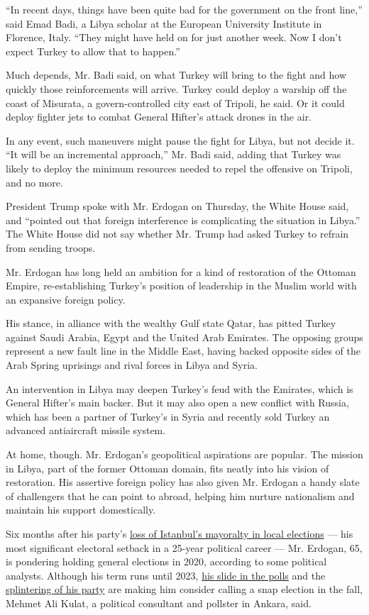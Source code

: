 ``In recent days, things have been quite bad for the government on the
front line,'' said Emad Badi, a Libya scholar at the European University
Institute in Florence, Italy. ``They might have held on for just another
week. Now I don't expect Turkey to allow that to happen.''

Much depends, Mr. Badi said, on what Turkey will bring to the fight and
how quickly those reinforcements will arrive. Turkey could deploy a
warship off the coast of Misurata, a govern-controlled city east of
Tripoli, he said. Or it could deploy fighter jets to combat General
Hifter's attack drones in the air.

In any event, such maneuvers might pause the fight for Libya, but not
decide it. ``It will be an incremental approach,'' Mr. Badi said, adding
that Turkey was likely to deploy the minimum resources needed to repel
the offensive on Tripoli, and no more.

President Trump spoke with Mr. Erdogan on Thursday, the White House
said, and ``pointed out that foreign interference is complicating the
situation in Libya.'' The White House did not say whether Mr. Trump had
asked Turkey to refrain from sending troops.

Mr. Erdogan has long held an ambition for a kind of restoration of the
Ottoman Empire, re-establishing Turkey's position of leadership in the
Muslim world with an expansive foreign policy.

His stance, in alliance with the wealthy Gulf state Qatar, has pitted
Turkey against Saudi Arabia, Egypt and the United Arab Emirates. The
opposing groups represent a new fault line in the Middle East, having
backed opposite sides of the Arab Spring uprisings and rival forces in
Libya and Syria.

An intervention in Libya may deepen Turkey's feud with the Emirates,
which is General Hifter's main backer. But it may also open a new
conflict with Russia, which has been a partner of Turkey's in Syria and
recently sold Turkey an advanced antiaircraft missile system.

At home, though. Mr. Erdogan's geopolitical aspirations are popular. The
mission in Libya, part of the former Ottoman domain, fits neatly into
his vision of restoration. His assertive foreign policy has also given
Mr. Erdogan a handy slate of challengers that he can point to abroad,
helping him nurture nationalism and maintain his support domestically.

Six months after his party's
\href{https://www.nytimes.com/2019/06/23/world/europe/istanbul-mayor-election-erdogan.html}{loss
of Istanbul's mayoralty in local elections} --- his most significant
electoral setback in a 25-year political career --- Mr. Erdogan, 65, is
pondering holding general elections in 2020, according to some political
analysts. Although his term runs until 2023,
\href{https://www.nytimes.com/2019/12/23/world/middleeast/istanbul-mayor-erdogan.html}{his
slide in the polls} and the
\href{https://www.nytimes.com/2019/12/13/world/europe/ahmet-davutoglu-erdogan-turkey.html}{splintering
of his party} are making him consider calling a snap election in the
fall, Mehmet Ali Kulat, a political consultant and pollster in Ankara,
said.

